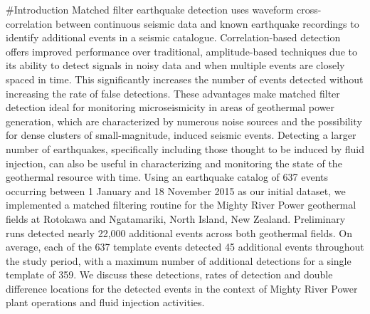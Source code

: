 #Introduction
Matched filter earthquake detection uses waveform cross-correlation between continuous seismic data and known earthquake recordings to identify additional events in a seismic catalogue. Correlation-based detection offers improved performance over traditional, amplitude-based techniques due to its ability to detect signals in noisy data and when multiple events are closely spaced in time. This significantly increases the number of events detected without increasing the rate of false detections. These advantages make matched filter detection ideal for monitoring microseismicity in areas of geothermal power generation, which are characterized by numerous noise sources and the possibility for dense clusters of small-magnitude, induced seismic events. Detecting a larger number of earthquakes, specifically including those thought to be induced by fluid injection, can also be useful in characterizing and monitoring the state of the geothermal resource with time. Using an earthquake catalog of 637 events occurring between 1 January and 18 November 2015 as our initial dataset, we implemented a matched filtering routine for the Mighty River Power geothermal fields at Rotokawa and Ngatamariki, North Island, New Zealand. Preliminary runs detected nearly 22,000 additional events across both geothermal fields. On average, each of the 637 template events detected 45 additional events throughout the study period, with a maximum number of additional detections for a single template of 359. We discuss these detections, rates of detection and double difference locations for the detected events in the context of Mighty River Power plant operations and fluid injection activities. 